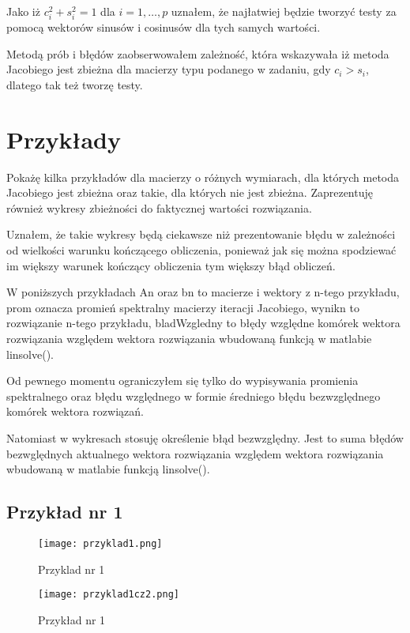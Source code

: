 \documentclass{article}
\begin{document}
Jako iż \(c_i^2+s_i^2=1\) dla \(i=1,\dots,p\) uznałem, że najłatwiej będzie tworzyć testy za pomocą wektorów sinusów i cosinusów dla tych samych wartości.

Metodą prób i błędów zaobserwowałem zależność, która wskazywała iż metoda Jacobiego jest zbieżna dla macierzy typu podanego w zadaniu, gdy \(c_i>s_i\), dlatego tak też tworzę testy.

\section{Przykłady}

Pokażę kilka przykładów dla macierzy o różnych wymiarach, dla których metoda Jacobiego jest zbieżna oraz takie, dla których nie jest zbieżna. Zaprezentuję również wykresy zbieżności do faktycznej wartości rozwiązania. 

Uznałem, że takie wykresy będą ciekawsze niż prezentowanie błędu w zależności od wielkości warunku kończącego obliczenia, ponieważ jak się można spodziewać im większy warunek kończący obliczenia tym większy błąd obliczeń.

W poniższych przykładach An oraz bn to macierze i wektory z n-tego przykładu, prom oznacza promień spektralny macierzy iteracji Jacobiego, wynikn to rozwiązanie n-tego przykładu, bladWzgledny to błędy względne komórek wektora rozwiązania względem wektora rozwiązania wbudowaną funkcją w matlabie linsolve(). 

Od pewnego momentu ograniczyłem się tylko do wypisywania promienia spektralnego oraz błędu względnego w formie średniego błędu bezwzględnego komórek wektora rozwiązań.

Natomiast w wykresach stosuję określenie błąd bezwzględny. Jest to suma błędów bezwględnych aktualnego wektora rozwiązania względem wektora rozwiązania wbudowaną w matlabie funkcją linsolve().

\subsection{Przykład nr 1}

\begin{figure}[H]
  \caption{Przyklad nr 1}
  \centering
  \texttt{[image: przyklad1.png]}
\end{figure}

\begin{figure}[H]
  \caption{Przykład nr 1}
  \centering
  \texttt{[image: przyklad1cz2.png]}
\end{figure}
\end{document}
